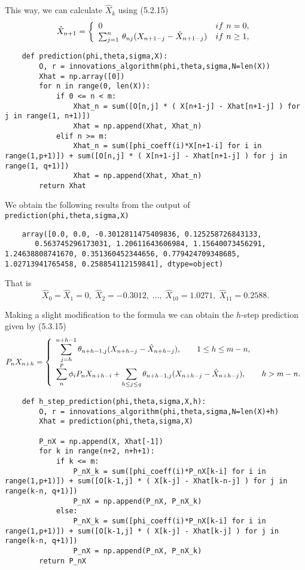 This way, we can calculate $\hat{X}_k$ using (5.2.15)
\[ \hat{X}_{n+1}=\left\{\begin{array}{l l}{{0}}&{{i f\ n=0,}}\\ {{\sum_{j=1}^{n}\,\theta_{n j}(X_{n+1-j}-\hat{X}_{n+1-j})}}&{{i f\ n\geq1,}}\end{array}\right. \]

\begin{verbatim}
    def prediction(phi,theta,sigma,X):
        O, r = innovations_algorithm(phi,theta,sigma,N=len(X))
        Xhat = np.array([0])
        for n in range(0, len(X)):
            if 0 <= n < m:
                Xhat_n = sum([O[n,j] * ( X[n+1-j] - Xhat[n+1-j] ) for j in range(1, n+1)])
                Xhat = np.append(Xhat, Xhat_n)
            elif n >= m:
                Xhat_n = sum([phi_coeff(i)*X[n+1-i] for i in range(1,p+1)]) + sum([O[n,j] * ( X[n+1-j] - Xhat[n+1-j] ) for j in range(1, q+1)])
                Xhat = np.append(Xhat, Xhat_n)
        return Xhat
\end{verbatim}

We obtain the following results from the output of \texttt{prediction(phi,theta,sigma,X)}
\begin{verbatim}
    array([0.0, 0.0, -0.3012811475409836, 0.125258726843133,
       0.563745296173031, 1.20611643606984, 1.15640073456291, 1.24638808741670, 0.351360452344656, 0.779424709348685, 1.02713941765458, 0.258854112159841], dtype=object)
\end{verbatim}
That is
\[ \hat{X}_0 = \hat{X}_1 = 0,\;\hat{X}_2 = -0.3012,\; \ldots,\;\hat{X}_{10} = 1.0271,\; \hat{X}_{11} = 0.2588.  \]

Making a slight modification to the formula we can obtain the $h$-step prediction given by (5.3.15)
\[ P_{n}X_{n+h}=\left\{\begin{array}{l l}{{\displaystyle\sum_{j=h}^{n+h-1}\theta_{n+h-1,j}(X_{n+h-j}-\hat{X}_{n+h-j}),\qquad1\leq h\leq m-n,\qquad}}\\ {{\displaystyle\sum_{n}^{p}\phi_{i}P_{n}X_{n+h-i}+\sum_{h\leq j\leq q}\theta_{n+h-1,j}(X_{n+h-j}-\hat{X}_{n+h-j}),\qquad h>m-n.}}\end{array}\right.
\]

\begin{verbatim}
    def h_step_prediction(phi,theta,sigma,X,h):
        O, r = innovations_algorithm(phi,theta,sigma,N=len(X)+h)
        Xhat = prediction(phi,theta,sigma,X)

        P_nX = np.append(X, Xhat[-1])
        for k in range(n+2, n+h+1):
            if k <= m:
                P_nX_k = sum([phi_coeff(i)*P_nX[k-i] for i in range(1,p+1)]) + sum([O[k-1,j] * ( X[k-j] - Xhat[k-n-j] ) for j in range(k-n, q+1)])
                P_nX = np.append(P_nX, P_nX_k)
            else:
                P_nX_k = sum([phi_coeff(i)*P_nX[k-i] for i in range(1,p+1)]) + sum([O[k-1,j] * ( X[k-j] - Xhat[k-j] ) for j in range(k-n, q+1)])
                P_nX = np.append(P_nX, P_nX_k)
        return P_nX
\end{verbatim}


